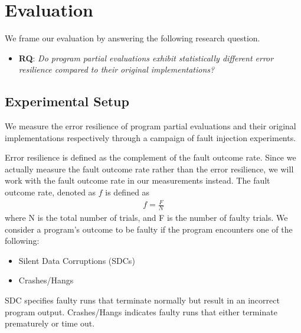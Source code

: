 \section{Evaluation}
\label{sec:evaluation}

We frame our evaluation by answering the following research question. 

\begin{itemize}
\item {\bf RQ}: \textit{Do program partial evaluations exhibit statistically different error resilience compared to their original implementations?}
\end{itemize}

\subsection{Experimental Setup}
\label{sec:exp.setup}

We measure the error resilience of program partial evaluations and their original implementations respectively through a campaign of fault injection experiments. 

Error resilience is defined as the complement of the fault outcome rate.
Since we actually measure the fault outcome rate rather than the error resilience, we will work with the fault outcome rate in our measurements instead.
The fault outcome rate, denoted as $f$ is defined as 
\begin{align*}
f = \frac{F}{N}
\end{align*}
where N is the total number of trials, and F is the number of faulty trials.
We consider a program's outcome to be faulty if the program encounters one of the following:
\begin{itemize}
\item Silent Data Corruptions (SDCs) 
\item Crashes/Hangs
\end{itemize}

SDC specifies faulty runs that terminate normally but result in an incorrect program output. 
Crashes/Hangs indicates faulty runs that either terminate prematurely or time out.

\bigbreak

